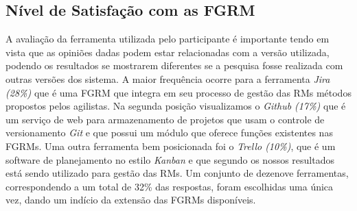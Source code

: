 \begin{table}[htpb]
\centering
{}
\caption{Tamanho da equipe dos participantes}\label{tab:melhorias_fgrm_tamanho_equipe}
\end{table}


\subsection{Nível de Satisfação com as FGRM}\label{sub:nivel_de_satisfação_com_as_fgrm}

A avaliação da ferramenta utilizada pelo participante é importante tendo em
vista que as opiniões dadas podem estar relacionadas com a versão utilizada,
podendo os resultados se mostrarem diferentes se a pesquisa fosse realizada com
outras versões dos sistema. A maior frequência ocorre para a ferramenta
\textit{Jira (28\%)} que é uma FGRM que integra em seu processo de gestão das
RMs métodos propostos pelos agilistas. Na segunda posição visualizamos o
\textit{Github (17\%)} que é um serviço de web para armazenamento de projetos
que usam o controle de versionamento \textit{Git} e que possui um módulo que
oferece funções existentes nas FGRMs. Uma outra ferramenta bem posicionada foi o
\textit{Trello (10\%)}, que é um software de planejamento no estilo
\textit{Kanban} e que segundo os nossos resultados está sendo utilizado para
gestão das RMs. Um conjunto de dezenove ferramentas, correspondendo a um total
de 32\% das respostas, foram escolhidas uma única vez, dando um indício da
extensão das FGRMs disponíveis.



